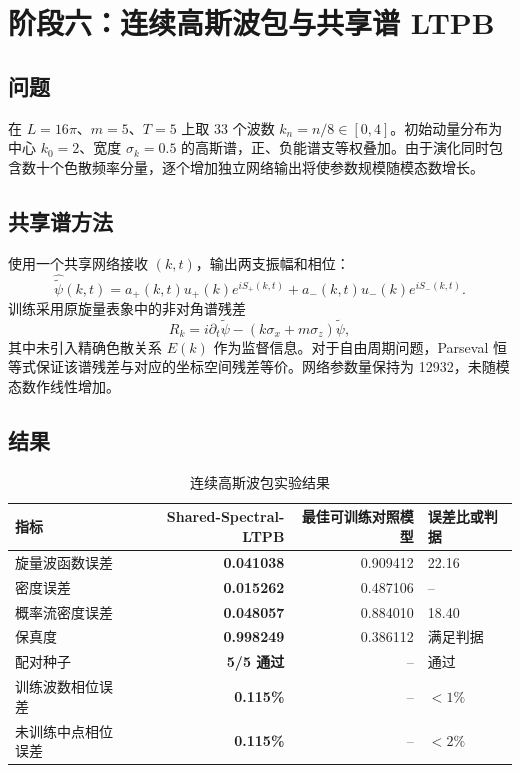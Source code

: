 \documentclass[UTF8,a4paper,12pt,fontset=fandol]{ctexart}
\begin{document}
\section{阶段六：连续高斯波包与共享谱 LTPB}

\subsection{问题}

在 $L=16\pi$、$m=5$、$T=5$ 上取 33 个波数 $k_n=n/8\in[0,4]$。初始动量分布为中心 $k_0=2$、宽度 $\sigma_k=0.5$ 的高斯谱，正、负能谱支等权叠加。由于演化同时包含数十个色散频率分量，逐个增加独立网络输出将使参数规模随模态数增长。

\subsection{共享谱方法}

使用一个共享网络接收 $(k,t)$，输出两支振幅和相位：
\begin{equation}
\widehat{\widetilde\psi}(k,t)=
a_+(k,t)u_+(k)e^{iS_+(k,t)}
+a_-(k,t)u_-(k)e^{iS_-(k,t)}.
\end{equation}
训练采用原旋量表象中的非对角谱残差
\begin{equation}
R_k=i\partial_t\widetilde\psi
-(k\sigma_x+m\sigma_z)\widetilde\psi,
\end{equation}
其中未引入精确色散关系 $E(k)$ 作为监督信息。对于自由周期问题，Parseval 恒等式保证该谱残差与对应的坐标空间残差等价。网络参数量保持为 12932，未随模态数作线性增加。

\subsection{结果}

\begin{table}[htbp]
\centering
\small
\caption{连续高斯波包实验结果}
\begin{tabularx}{\textwidth}{@{}Y r r l@{}}
\toprule
指标 & Shared-Spectral-LTPB & 最佳可训练对照模型 & 误差比或判据 \\
\midrule
旋量波函数误差 & \textbf{0.041038} & 0.909412 & 22.16 \\
密度误差 & \textbf{0.015262} & 0.487106 & -- \\
概率流密度误差 & \textbf{0.048057} & 0.884010 & 18.40 \\
保真度 & \textbf{0.998249} & 0.386112 & 满足判据 \\
配对种子 & \textbf{5/5 通过} & -- & 通过 \\
训练波数相位误差 & \textbf{0.115\%} & -- & $<1\%$ \\
未训练中点相位误差 & \textbf{0.115\%} & -- & $<2\%$ \\
\bottomrule
\end{tabularx}
\end{table}
\end{document}
